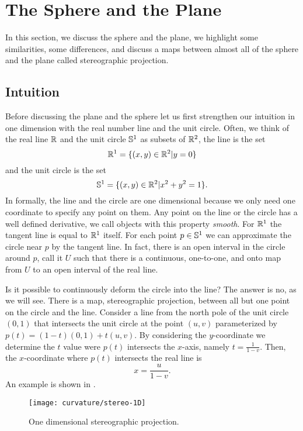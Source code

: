 \section{The Sphere and the Plane}
\label{sec:sphere-plane}

In this section, we discuss the sphere and the plane, we highlight some similarities, some differences,
 and discuss a maps between almost all of the sphere and the plane called stereographic projection.
 

\subsection{Intuition}

Before discussing the plane and the sphere let us first strengthen our intuition in 
one dimension with the real number line and the unit circle.
Often, we think of the real line $\mathbb{R}$ and the unit circle $\mathbb{S}^1$ as subsets of $\mathbb{R}^2$,
the line is the set
$$\mathbb{R}^1=\{(x,y)\in \mathbb{R}^2 | y=0\}$$
and the unit circle is the set
$$\mathbb{S}^1=\{(x,y)\in \mathbb{R}^2 | x^2+y^2=1\}.$$
In formally, the line and the circle are one dimensional because
we only need one coordinate to specify any point on them.
Any point on the line or the circle has a well defined derivative,
we call objects with this property \emph{smooth}.
For $\mathbb{R}^1$ the tangent line is equal to $\mathbb{R}^1$ itself. 
For each point $p\in \mathbb{S}^1$ we can approximate the circle
near $p$ by the tangent line.
In fact, there is an open interval in the circle around $p$, call it $U$ such
that there is a continuous, one-to-one, and onto map from $U$ to an open
interval of the real line.



Is it possible to continuously deform the circle into the line?
The answer is no, as we will see.
There is a map, stereographic projection, between all but one point on the circle
and the line.
Consider a line from the north pole of the unit circle $(0,1)$ that intersects
the unit circle at the point $(u,v)$ parameterized by $p(t)=(1-t)(0,1)+t(u,v).$
By considering the $y$-coordinate we determine the $t$ value were $p(t)$
intersects the $x$-axis, namely $t=\frac{1}{1-v}.$ Then, 
the $x$-coordinate where $p(t)$ intersects the real line is 
$$x=\frac{u}{1-v}.$$ An example is shown
in .

\begin{figure}[htb]
	\centering
	\texttt{[image: curvature/stereo-1D]}
	\caption{One dimensional stereographic projection.}
	\label{fig:stereo1D}
\end{figure}

